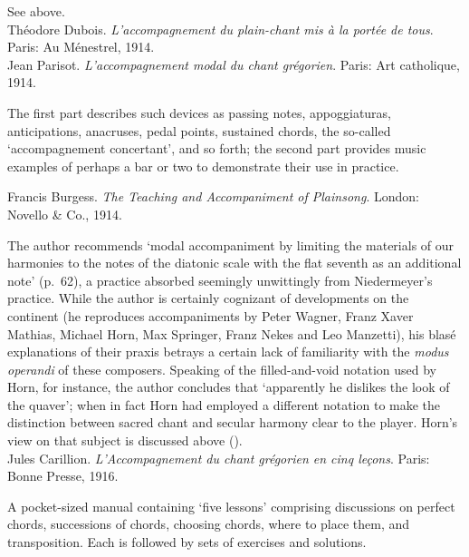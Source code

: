      \parindent=20pt
     \hangindent=20pt
     See  above.\\

    \parindent=0pt
    \hangindent=0pt
  \covid{}Théodore Dubois. \emph{L'accompagnement du plain-chant mis à la portée de tous}. Paris:  Au Ménestrel, 1914. \\

    \parindent=0pt
    \hangindent=0pt
  Jean Parisot. \emph{L'accompagnement modal du chant grégorien}. Paris:  Art catholique, 1914.

     \parindent=20pt
     \hangindent=20pt
     The first part describes such devices as passing notes, appoggiaturas, anticipations, anacruses, pedal points, sustained chords, the so-called `accompagnement concertant', and so forth; the second part provides music examples of perhaps a bar or two to demonstrate their use in practice.\\\pagebreak{}

    \parindent=0pt
    \hangindent=0pt
  Francis Burgess. \emph{The Teaching and Accompaniment of Plainsong}. London:  Novello \& Co., 1914.

     \parindent=20pt
     \hangindent=20pt
     The author recommends `modal accompaniment by limiting the materials of our harmonies to the notes of the diatonic scale with the flat seventh as an additional note' (p.~62), a practice absorbed seemingly unwittingly from Niedermeyer's practice. While the author is certainly cognizant of developments on the continent (he reproduces accompaniments by Peter Wagner, Franz Xaver Mathias, Michael Horn, Max Springer, Franz Nekes and Leo Manzetti), his blasé explanations of their praxis betrays a certain lack of familiarity with the \emph{modus operandi} of these composers. Speaking of the filled-and-void notation used by Horn, for instance, the author concludes that `apparently he dislikes the look of the quaver'; when in fact Horn had employed a different notation to make the distinction between sacred chant and secular harmony clear to the player. Horn's view on that subject is discussed above ().\\

    \parindent=0pt
    \hangindent=0pt
  Jules Carillion. \emph{L'Accompagnement du chant grégorien en cinq leçons}. Paris:  Bonne Presse, 1916.

     \parindent=20pt
     \hangindent=20pt
     A pocket-sized manual containing `five lessons' comprising discussions on perfect chords, successions of chords, choosing chords, where to place them, and transposition. Each is followed by sets of exercises and solutions.\\

